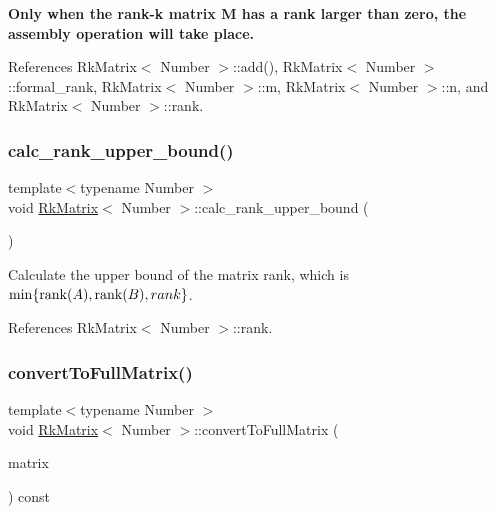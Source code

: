 {\bfseries Only when the rank-\/k matrix {\ttfamily M} has a rank larger than zero, the assembly operation will take place.}

References Rk\+Matrix$<$ Number $>$\+::add(), Rk\+Matrix$<$ Number $>$\+::formal\+\_\+rank, Rk\+Matrix$<$ Number $>$\+::m, Rk\+Matrix$<$ Number $>$\+::n, and Rk\+Matrix$<$ Number $>$\+::rank.

\mbox{\label{classRkMatrix_ab41155389e6ee81d5f127514ca3166b4}} 
\subsubsection{\texorpdfstring{calc\+\_\+rank\+\_\+upper\+\_\+bound()}{calc\_rank\_upper\_bound()}}
{\footnotesize\ttfamily template$<$typename Number $>$ \\
void \hyperlink{classRkMatrix}{Rk\+Matrix}$<$ Number $>$\+::calc\+\_\+rank\+\_\+upper\+\_\+bound (\begin{DoxyParamCaption}{ }\end{DoxyParamCaption})}

Calculate the upper bound of the matrix rank, which is $\min\{{\rm rank}(A), {\rm rank}(B), rank\}$. 

References Rk\+Matrix$<$ Number $>$\+::rank.

\mbox{\label{classRkMatrix_a384cdf3033d98f90b80d373add20b556}} 
\subsubsection{\texorpdfstring{convert\+To\+Full\+Matrix()}{convertToFullMatrix()}}
{\footnotesize\ttfamily template$<$typename Number $>$ \\
void \hyperlink{classRkMatrix}{Rk\+Matrix}$<$ Number $>$\+::convert\+To\+Full\+Matrix (\begin{DoxyParamCaption}\item[{\hyperlink{classLAPACKFullMatrixExt}{L\+A\+P\+A\+C\+K\+Full\+Matrix\+Ext}$<$ Number $>$ \&}]{matrix }\end{DoxyParamCaption}) const}

